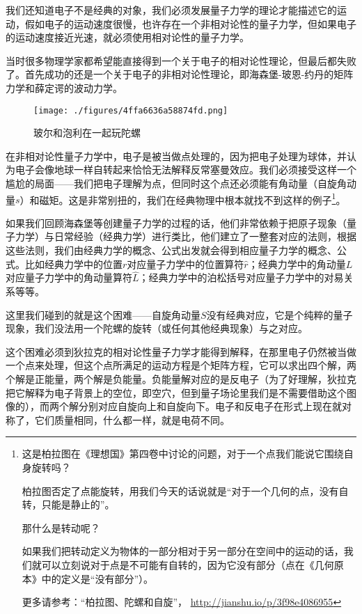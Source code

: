 我们还知道电子不是经典的对象，我们必须发展量子力学的理论才能描述它的运动，假如电子的运动速度很慢，也许存在一个非相对论性的量子力学，但如果电子的运动速度接近光速，就必须使用相对论性的量子力学。

当时很多物理学家都希望能直接得到一个关于电子的相对论性理论，但最后都失败了。首先成功的还是一个关于电子的非相对论性理论，即海森堡-玻恩-约丹的矩阵力学和薛定谔的波动力学。

\begin{figure}[ht]
\centering
\texttt{[image: ./figures/4ffa6636a58874fd.png]}
\caption{玻尔和泡利在⼀起玩陀螺} \label{fig_QMPre2_11}
\end{figure}

在非相对论性量子力学中，电子是被当做点处理的，因为把电子处理为球体，并认为电子会像地球一样自转起来恰恰无法解释反常塞曼效应。我们必须接受这样一个尴尬的局面——我们把电子理解为点，但同时这个点还必须能有角动量（自旋角动量$s$）和磁矩。这是非常别扭的，我们在经典物理中根本就找不到这样的例子\footnote{这是柏拉图在《理想国》第四卷中讨论的问题，对于一个点我们能说它围绕自身旋转吗？

柏拉图否定了点能旋转，用我们今天的话说就是“对于一个几何的点，没有自转，只能是静止的”。

那什么是转动呢？

如果我们把转动定义为物体的一部分相对于另一部分在空间中的运动的话，我们就可以立刻说对于点是不可能有自转的，因为它没有部分（点在《几何原本》中的定义是“没有部分”）。

更多请参考：“柏拉图、陀螺和自旋”， \url{http://jianshu.io/p/3f98e4086955} }。

如果我们回顾海森堡等创建量子力学的过程的话，他们非常依赖于把原子现象（量子力学）与日常经验（经典力学）进行类比，他们建立了一整套对应的法则，根据这些法则，我们由经典力学的概念、公式出发就会得到相应量子力学的概念、公式。比如经典力学中的位置$r$对应量子力学中的位置算符$\hat r$；经典力学中的角动量$L$对应量子力学中的角动量算符$\hat L$；经典力学中的泊松括号对应量子力学中的对易关系等等。

这里我们碰到的就是这个困难——自旋角动量$S$没有经典对应，它是个纯粹的量子现象，我们没法用一个陀螺的旋转（或任何其他经典现象）与之对应。

这个困难必须到狄拉克的相对论性量子力学才能得到解释，在那里电子仍然被当做一个点来处理，但这个点所满足的运动方程是个矩阵方程，它可以求出四个解，两个解是正能量，两个解是负能量。负能量解对应的是反电子（为了好理解，狄拉克把它解释为电子背景上的空位，即空穴，但到量子场论里我们是不需要借助这个图像的），而两个解分别对应自旋向上和自旋向下。电子和反电子在形式上现在就对称了，它们质量相同，什么都一样，就是电荷不同。

